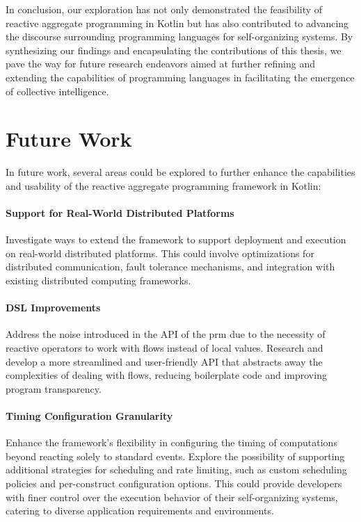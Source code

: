 In conclusion, our exploration has not only demonstrated the feasibility of reactive aggregate programming in Kotlin but has also contributed to advancing the discourse surrounding programming languages for self-organizing systems. By synthesizing our findings and encapsulating the contributions of this thesis, we pave the way for future research endeavors aimed at further refining and extending the capabilities of programming languages in facilitating the emergence of collective intelligence.

\section{Future Work}

In future work, several areas could be explored to further enhance the capabilities and usability of the reactive aggregate programming framework in Kotlin:

\paragraph{Support for Real-World Distributed Platforms}

Investigate ways to extend the framework to support deployment and execution on real-world distributed platforms. This could involve optimizations for distributed communication, fault tolerance mechanisms, and integration with existing distributed computing frameworks.

\paragraph{DSL Improvements}

Address the noise introduced in the API of the \ac{prm} due to the necessity of reactive operators to work with flows instead of local values. Research and develop a more streamlined and user-friendly API that abstracts away the complexities of dealing with flows, reducing boilerplate code and improving program transparency.

\paragraph{Timing Configuration Granularity}

Enhance the framework's flexibility in configuring the timing of computations beyond reacting solely to standard events. Explore the possibility of supporting additional strategies for scheduling and rate limiting, such as custom scheduling policies and per-construct configuration options. This could provide developers with finer control over the execution behavior of their self-organizing systems, catering to diverse application requirements and environments.
